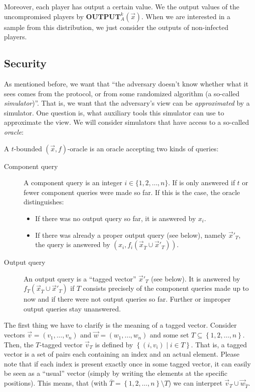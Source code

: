 \message{ !name(seminar.tex)}\documentclass{llncs}
\begin{document}
Moreover, each player has output a certain value. We the output values of the uncompromised players by $\mathbf{OUTPUT}_A^k(\overrightarrow{x})$. When we are interested in a sample from this distribution, we just consider the outputs of non-infected players.

\subsection{Security}
\label{sec:definitions-security}

As mentioned before, we want that ``the adversary doesn't know whether what it sees comes from the protocol, or from some randomized algorithm (a so-called \emph{simulator})''. That is, we want that the adversary's view can be \emph{approximated} by a simulator. One question is, what auxiliary tools this simulator can use to approximate the view. We will consider simulators that have access to a so-called \emph{oracle}:

\begin{definition}
  A $t$-bounded $(\overrightarrow{x},f)$-oracle is an oracle accepting two kinds of queries:
  \begin{description}
  \item[Component query] A component query is an integer $i\in \{1,2,\dots,n\}$. If is only answered if $t$ or fewer component queries were made so far. If this is the case, the oracle distinguishes:
    \begin{itemize}
    \item If there was no output query so far, it is answered by $x_i$.
    \item If there was already a proper output query (see below), namely $\overrightarrow{x}'_T$, the query is answered by $(x_i,f_i(\overrightarrow{x}_{\overline{T}}\cup\overrightarrow{x}'_{T}))$.
    \end{itemize}
\item[Output query] An output query is a ``tagged vector'' $\overrightarrow{x}'_T$ (see below). It is answered by $f_T(\overrightarrow{x}_{\overline{T}}\cup\overrightarrow{x}'_{T})$ if $T$ consists precisely of the component queries made up to now and if there were not output queries so far. Further or improper output queries stay unanswered.
  \end{description}
\end{definition}

The first thing we have to clarify is the meaning of a tagged vector. Consider vectors $\overrightarrow{v}=(v_1,\dots,v_n)$ and $\overrightarrow{w}=(w_1,\dots,w_n)$ and some set $T\subseteq \left\{ 1,2,\dots,n \right\}$. Then, the $T$-tagged vector $\overrightarrow{v}_T$ is defined by $\left\{ (i,v_i) \mid i\in T \right\}$. That is, a tagged vector is a set of pairs each containing an index and an actual element. Please note that if each index is present exactly once in some tagged vector, it can easily be seen as a ``usual'' vector (simply by writing the elements at the specific positions). This means, that (with $\overline{T}=\left\{ 1,2,\dots,n \right\}\setminus T$) we can interpret $\overrightarrow{v}_T\cup \overrightarrow w_{\overline{T}}$.
\end{document}
